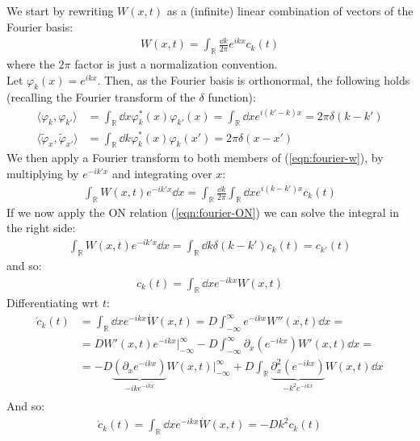 \documentclass[../template.tex]{subfiles}
\begin{document}
We start by rewriting $W(x,t)$ as a (infinite) linear combination of vectors of the Fourier basis: 
\begin{align}
    W(x,t) = \int_{\mathbb{R}} \frac{\dd{k}}{2 \pi} e^{ikx} c_k(t) 
    \label{eqn:fourier-w}
\end{align}
where the $2\pi$ factor is just a normalization convention.\\
Let $\varphi_k(x) = e^{ikx}$. Then, as the Fourier basis is orthonormal, the following holds (recalling the Fourier transform of the $\delta$ function):
\begin{align}\label{eqn:fourier-ON}
    \langle \varphi_k, \varphi_{k'} \rangle &= \int_{\mathbb{R}} \dd{x} \varphi_k^*(x) \varphi_{k'}(x) = \int_{\mathbb{R}} \dd{x} e^{i(k'-k)x} = 2\pi \delta(k-k')\\ \nonumber
    \langle \tilde{\varphi}_x, \tilde{\varphi}_{x'} \rangle &= \int_{\mathbb{R}} \dd{k} \varphi_k^*(x) \varphi_k(x') = 2 \pi\delta(x-x') 
\end{align} 
We then apply a Fourier transform to both members of (\ref{eqn:fourier-w}), by multiplying by $e^{-ik'x}$ and integrating over $x$:
\begin{align*}
    \int_{\mathbb{R}} W(x,t) e^{-ik'x} \dd{x} = \int_{\mathbb{R}} \frac{\dd{k}}{2\pi}  \int_{\mathbb{R}} \dd{x} e^{i(k-k')x} c_k(t)
\end{align*}  
If we now apply the ON relation (\ref{eqn:fourier-ON}) we can solve the integral in the right side:
\begin{align*}
    \int_{\mathbb{R}} W(x,t) e^{-ik'x}\dd{x} = \int_{\mathbb{R}} \dd{k} \delta(k-k') c_k(t) = c_{k'}(t)
\end{align*}
and so:
\begin{align*}
    c_k(t) = \int_{\mathbb{R}} \dd{x} e^{-ikx} W(x,t)
\end{align*}
Differentiating wrt $t$:
\begin{align*}
    \dot{c}_k(t) &= \int_{\mathbb{R}} \dd{x} e^{-ikx} \dot{W}(x,t) = D \int_{-\infty}^{\infty} e^{-ikx} W''(x,t) \dd{x} =  \\
    &= D W'(x,t) e^{-ikx}\big|_{-\infty}^{\infty} - D \int_{-\infty}^{\infty} \partial_x (e^{-ikx}) W'(x,t) \dd{x} = \\
    &= -D\underbrace{(\partial_x e^{-ikx})}_{-ik e^{-ikx}} W(x,t) \big|_{-\infty}^{\infty} + D\int_{\mathbb{R}} \underbrace{\partial_x^2 (e^{-ikx})}_{-k^2 e^{-ikx}} W(x,t) \dd{x} \\
\end{align*} 
And so:
\begin{align*}
    \dot{c}_k(t) = \int_{\mathbb{R}} \dd{x} e^{-ikx} \dot{W}(x,t) = - D k^2 c_k(t)
\end{align*}
\end{document}
